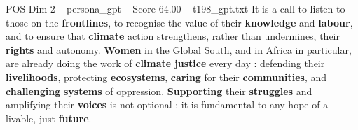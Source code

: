 \begin{textsample}{POS Dim 2 – persona\_gpt – Score 64.00 – t198\_gpt.txt}
It is a call to listen to those on the \textbf{frontlines}, to recognise the value of their \textbf{knowledge} and \textbf{labour}, and to ensure that \textbf{climate} action strengthens, rather than undermines, their \textbf{rights} and autonomy. \textbf{Women} in the Global South, and in Africa in particular, are already doing the work of \textbf{climate} \textbf{justice} every day : defending their \textbf{livelihoods}, protecting \textbf{ecosystems}, \textbf{caring} for their \textbf{communities}, and \textbf{challenging} \textbf{systems} of oppression. \textbf{Supporting} their \textbf{struggles} and amplifying their \textbf{voices} is not optional ; it is fundamental to any hope of a livable, just \textbf{future}.

\end{textsample}
